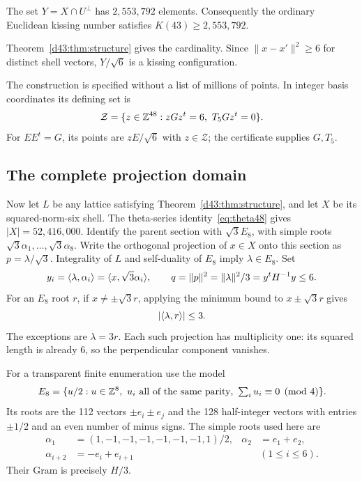 \begin{corollary}\label{d43:thm:main}
The set $Y=X\cap U^\perp$ has $2,553,792$ elements. Consequently the ordinary
Euclidean kissing number satisfies $K(43)\ge2,553,792$.
\end{corollary}

Theorem~\ref{d43:thm:structure} gives the cardinality. Since
$\|x-x'\|^2\ge6$ for distinct shell vectors, $Y/\sqrt6$ is a
kissing configuration.

The construction is specified without a list of millions of points. In
integer basis coordinates its defining set is
\begin{equation}\label{d43:eq:integer}
\mathcal Z=\{z\in\mathbb Z^{48}:zGz^t=6,\ T_5Gz^t=0\}.
\end{equation}
For $EE^t=G$, its points are $zE/\sqrt6$ with $z\in\mathcal Z$;
the certificate supplies $G,T_5$.

\subsection{The complete projection domain}
Now let $L$ be any lattice satisfying Theorem~\ref{d43:thm:structure},
and let $X$ be its squared-norm-six shell. The theta-series
identity~\eqref{eq:theta48} gives $|X|=52,416,000$.
Identify the parent section with $\sqrt3E_8$, with simple roots
$\sqrt3\alpha_1,\ldots,\sqrt3\alpha_8$. Write the orthogonal projection of
$x\in X$ onto this section as $p=\lambda/\sqrt3$.
Integrality of $L$ and self-duality of $E_8$ imply $\lambda\in E_8$. Set
\[
y_i=\langle \lambda,\alpha_i\rangle=\langle x,\sqrt3\alpha_i\rangle,\qquad
q=\|p\|^2=\|\lambda\|^2/3=y^tH^{-1}y\le6.
\]
For an $E_8$ root $r$, if $x\ne\pm\sqrt3r$, applying the minimum bound to
$x\pm\sqrt3r$ gives
\begin{equation}\label{d43:eq:rootbound}
|\langle \lambda,r\rangle|\le3.
\end{equation}
The exceptions are $\lambda=3r$. Each such projection has multiplicity one:
its squared length is already 6, so the perpendicular component vanishes.

For a transparent finite enumeration use the model
\[
E_8=\{u/2:u\in\mathbb Z^8,\ u_i\text{ all of the same parity},\
\textstyle\sum_i u_i\equiv0\pmod4\}.
\]
Its roots are the 112 vectors $\pm e_i\pm e_j$ and the 128 half-integer
vectors with entries $\pm1/2$ and an even number of minus signs.
The simple roots used here are
\begin{equation}\label{d43:eq:simple}
\begin{aligned}
\alpha_1&=(1,-1,-1,-1,-1,-1,-1,1)/2, &\alpha_2&=e_1+e_2,\\
\alpha_{i+2}&=-e_i+e_{i+1} &&(1\le i\le6).
\end{aligned}
\end{equation}
Their Gram is precisely $H/3$.

